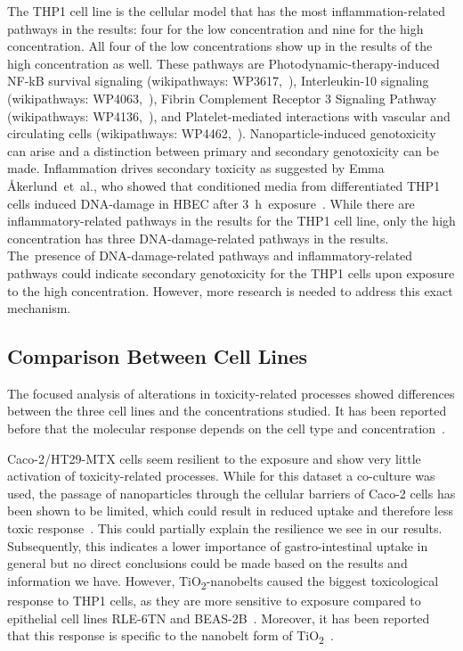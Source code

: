 \documentclass[ijms,article,accept,moreauthors,pdftex]{Definitions/mdpi}
\begin{document}
\begin{paracol}{2}
{The THP1 cell line is the cellular model that has the most inflammation-related pathways in the results: four for the low concentration and nine for the high concentration. All four of the low concentrations show up in the results of the high concentration as well. These pathways are Photodynamic-therapy-induced NF-kB survival signaling} (wikipathways: WP3617,~\cite{WP3617}), {Interleukin-10 signaling} (wikipathways: WP4063,~\cite{WP4063}), {Fibrin Complement Receptor 3 Signaling Pathway} (wikipathways: WP4136,~\cite{WP4136}), {and Platelet-mediated interactions with vascular and circulating cells} (wikipathways: WP4462,~\cite{WP4462}).
{Nanoparticle-induced genotoxicity can arise and a distinction between primary and secondary genotoxicity can be made. Inflammation drives secondary toxicity as suggested by} Emma Åkerlund~et~al., {who showed that conditioned media from differentiated THP1 cells induced DNA-damage in HBEC after} 3~h~exposure~\cite{Akerlund2019}. {While there are inflammatory-related pathways in the results for the THP1 cell line, only the high concentration has three DNA-damage-related pathways in the results. The~presence of DNA-damage-related pathways and inflammatory-related pathways could indicate secondary genotoxicity for the THP1 cells upon exposure to the high concentration. However, more research is needed to address this exact mechanism.} 

\subsection{Comparison Between Cell Lines}
The focused analysis of alterations in toxicity-related processes showed differences between the three cell lines and the concentrations studied. It has been reported before that the molecular response depends on the cell type and concentration~\cite{TadaOikawa2016}. 

{Caco-2/HT29-MTX} cells seem resilient to the exposure and show very little activation of toxicity-related processes. {While for this dataset a co-culture was used,} the passage of nanoparticles through the cellular barriers of {Caco-2} cells has been shown to be limited, which could result in reduced uptake and therefore less toxic response~\cite{Ye2017}. {This could partially explain the resilience we see in our results.} Subsequently, this indicates a lower importance of gastro-intestinal uptake in general {but no direct conclusions could be made based on the results and information we have.} However, TiO\textsubscript{2}-nanobelts caused the biggest toxicological response to THP1 cells, as they are more sensitive to exposure compared to epithelial cell lines RLE-6TN and BEAS-2B~\cite{Xia2013}. Moreover, it has been reported that this response is specific to the nanobelt form of TiO\textsubscript{2}~\cite{Xia2013}.


\end{paracol}
\end{document}
